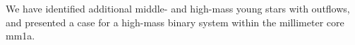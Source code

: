 We have identified additional middle- and high-mass young stars with outflows, and 
presented a case for a high-mass binary system within the millimeter core mm1a.

% 
% 
% 


%
%


